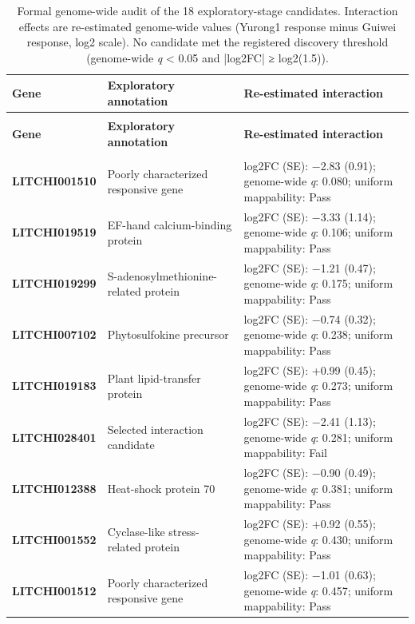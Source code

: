 \documentclass[12pt,letterpaper]{article}
\begin{document}
\clearpage
\setlength{\tabcolsep}{5pt}
\begin{longtable}{@{}>{\raggedright\arraybackslash}p{}>{\raggedright\arraybackslash}p{}>{\raggedright\arraybackslash}p{}@{}}
\caption{Formal genome-wide audit of the 18 exploratory-stage candidates. Interaction effects are re-estimated genome-wide values (Yurong1 response minus Guiwei response, log2 scale). No candidate met the registered discovery threshold (genome-wide \textit{q} < 0.05 and |log2FC| ≥ log2(1.5)).} \\
\toprule
\textbf{Gene} & \textbf{Exploratory annotation} & \textbf{Re-estimated interaction} \\
\midrule
\endfirsthead
\multicolumn{3}{l}{\textit{Table 2 continued}} \\
\toprule
\textbf{Gene} & \textbf{Exploratory annotation} & \textbf{Re-estimated interaction} \\
\midrule
\endhead
\midrule \multicolumn{3}{r}{\textit{Continued on next page}} \\
\endfoot
\bottomrule
\endlastfoot
\textbf{LITCHI001510} & Poorly characterized responsive gene & log2FC (SE): −2.83 (0.91); genome-wide \textit{q}: 0.080; uniform mappability: Pass \\
\textbf{LITCHI019519} & EF-hand calcium-binding protein & log2FC (SE): −3.33 (1.14); genome-wide \textit{q}: 0.106; uniform mappability: Pass \\
\textbf{LITCHI019299} & S-adenosylmethionine-related protein & log2FC (SE): −1.21 (0.47); genome-wide \textit{q}: 0.175; uniform mappability: Pass \\
\textbf{LITCHI007102} & Phytosulfokine precursor & log2FC (SE): −0.74 (0.32); genome-wide \textit{q}: 0.238; uniform mappability: Pass \\
\textbf{LITCHI019183} & Plant lipid-transfer protein & log2FC (SE): +0.99 (0.45); genome-wide \textit{q}: 0.273; uniform mappability: Pass \\
\textbf{LITCHI028401} & Selected interaction candidate & log2FC (SE): −2.41 (1.13); genome-wide \textit{q}: 0.281; uniform mappability: Fail \\
\textbf{LITCHI012388} & Heat-shock protein 70 & log2FC (SE): −0.90 (0.49); genome-wide \textit{q}: 0.381; uniform mappability: Pass \\
\textbf{LITCHI001552} & Cyclase-like stress-related protein & log2FC (SE): +0.92 (0.55); genome-wide \textit{q}: 0.430; uniform mappability: Pass \\
\textbf{LITCHI001512} & Poorly characterized responsive gene & log2FC (SE): −1.01 (0.63); genome-wide \textit{q}: 0.457; uniform mappability: Pass \\

\end{longtable}
\end{document}
